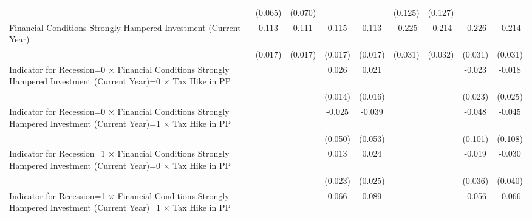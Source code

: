 {\begin{tabular}{l*{8}{c}}
                    &     (0.065)         &     (0.070)         &                     &                     &     (0.125)         &     (0.127)         &                     &                     \\
Financial Conditions Strongly Hampered Investment (Current Year)&       0.113\sym{***}&       0.111\sym{***}&       0.115\sym{***}&       0.113\sym{***}&      -0.225\sym{***}&      -0.214\sym{***}&      -0.226\sym{***}&      -0.214\sym{***}\\
                    &     (0.017)         &     (0.017)         &     (0.017)         &     (0.017)         &     (0.031)         &     (0.032)         &     (0.031)         &     (0.031)         \\
Indicator for Recession=0 $\times$ Financial Conditions Strongly Hampered Investment (Current Year)=0 $\times$ Tax Hike in PP&                     &                     &       0.026\sym{*}  &       0.021         &                     &                     &      -0.023         &      -0.018         \\
                    &                     &                     &     (0.014)         &     (0.016)         &                     &                     &     (0.023)         &     (0.025)         \\
Indicator for Recession=0 $\times$ Financial Conditions Strongly Hampered Investment (Current Year)=1 $\times$ Tax Hike in PP&                     &                     &      -0.025         &      -0.039         &                     &                     &      -0.048         &      -0.045         \\
                    &                     &                     &     (0.050)         &     (0.053)         &                     &                     &     (0.101)         &     (0.108)         \\
Indicator for Recession=1 $\times$ Financial Conditions Strongly Hampered Investment (Current Year)=0 $\times$ Tax Hike in PP&                     &                     &       0.013         &       0.024         &                     &                     &      -0.019         &      -0.030         \\
                    &                     &                     &     (0.023)         &     (0.025)         &                     &                     &     (0.036)         &     (0.040)         \\
Indicator for Recession=1 $\times$ Financial Conditions Strongly Hampered Investment (Current Year)=1 $\times$ Tax Hike in PP&                     &                     &       0.066         &       0.089         &                     &                     &      -0.056         &      -0.066         \\

\end{tabular}}
